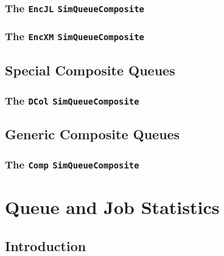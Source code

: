 \documentclass[12pt]{book}
\begin{document}
\subsection{The \lstinline{EncJL} \lstinline{SimQueueComposite}}
\label{sec:EncJL}

\subsection{The \lstinline{EncXM} \lstinline{SimQueueComposite}}
\label{sec:EncXM}

\section{Special Composite Queues}

\subsection{The \lstinline|DCol| \lstinline{SimQueueComposite}}
\label{sec:DCol}

\section{Generic Composite Queues}

\subsection{The \lstinline{Comp} \lstinline{SimQueueComposite}}
\label{sec:Comp}

\chapter{Queue and Job Statistics}
\label{chap:statistics}

\section{Introduction}
\label{stat-intro}
\end{document}
